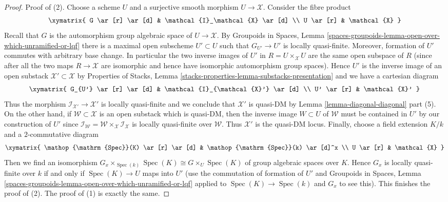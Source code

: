\documentclass{stacks-project}
\theoremstyle{plain}
\theoremstyle{definition}
\theoremstyle{remark}
\numberwithin{equation}{subsection}
\def\Spec{\mathop{\mathrm{Spec}}}
\begin{document}
\begin{proof}
Proof of (2). Choose a scheme $U$ and a surjective smooth morphism
$U \to \mathcal{X}$. Consider the fibre product
$$
\xymatrix{
G \ar[r] \ar[d] & \mathcal{I}_\mathcal{X} \ar[d] \\
U \ar[r] & \mathcal{X}
}
$$
Recall that $G$ is the automorphism group algebraic space of
$U \to \mathcal{X}$. By Groupoids in Spaces, Lemma
\ref{spaces-groupoids-lemma-open-over-which-unramified-or-lqf}
there is a maximal open subscheme $U' \subset U$
such that $G_{U'} \to U'$ is locally quasi-finite.
Moreover, formation of $U'$ commutes with arbitrary
base change. In particular the two inverse images of $U'$
in $R = U \times_\mathcal{X} U$ are the same open subspace of $R$
(since after all the two maps $R \to \mathcal{X}$ are isomorphic
and hence have isomorphic automorphism group spaces).
Hence $U'$ is the inverse image of an open substack
$\mathcal{X}' \subset \mathcal{X}$ by
Properties of Stacks, Lemma
\ref{stacks-properties-lemma-substacks-presentation}
and we have a cartesian diagram
$$
\xymatrix{
G_{U'} \ar[r] \ar[d] & \mathcal{I}_{\mathcal{X}'} \ar[d] \\
U' \ar[r] & \mathcal{X}'
}
$$
Thus the morphism $\mathcal{I}_{\mathcal{X}'} \to \mathcal{X}'$
is locally quasi-finite and we conclude that
$\mathcal{X}'$ is quasi-DM by Lemma \ref{lemma-diagonal-diagonal}
part (5). On the other hand, if $\mathcal{W} \subset \mathcal{X}$
is an open substack which is quasi-DM, then the inverse image
$W \subset U$ of $\mathcal{W}$ must be contained in $U'$ by our
construction of $U'$ since
$\mathcal{I}_\mathcal{W} =
\mathcal{W} \times_\mathcal{X} \mathcal{I}_\mathcal{X}$
is locally quasi-finite over $\mathcal{W}$.
Thus $\mathcal{X}'$ is the quasi-DM locus.
Finally, choose a field extension $K/k$ and a $2$-commutative
diagram
$$
\xymatrix{
\Spec(K) \ar[r] \ar[d] & \Spec(k) \ar[d]^x \\
U \ar[r] & \mathcal{X}
}
$$
Then we find an isomorphism
$G_x \times_{\Spec(k)} \Spec(K) \cong G \times_U \Spec(K)$
of group algebraic spaces over $K$. Hence $G_x$ is locally quasi-finite
over $k$ if and only if $\Spec(K) \to U$ maps into $U'$
(use the commutation of formation of $U'$ and
Groupoids in Spaces, Lemma
\ref{spaces-groupoids-lemma-open-over-which-unramified-or-lqf}
applied to $\Spec(K) \to \Spec(k)$ and $G_x$ to see this).
This finishes the proof of (2). The proof of (1) is
exactly the same.
\end{proof}
\end{document}
